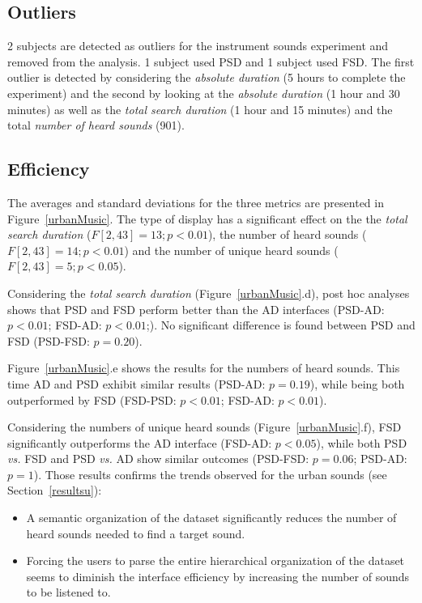 \documentclass{aes2e}
\begin{document}
\subsection{Outliers}

2 subjects are detected as outliers for the instrument sounds experiment and removed from the analysis. 1 subject used PSD and 1 subject used FSD. The first outlier is detected by considering the \textit{absolute duration} (5 hours to complete the experiment) and the second by looking at the \textit{absolute duration} (1 hour and 30 minutes) as well as the \textit{total search duration} (1 hour and 15 minutes) and the total \textit{number of heard sounds} (901).

\subsection{Efficiency}

The averages and standard deviations for the three metrics are presented in Figure~\ref{urbanMusic}. The type of display has a significant effect on the the \textit{total search duration} ($F[2,43]=13; p<0.01$), the number of heard sounds ($F[2,43]=14; p<0.01$) and the number of unique heard sounds ($F[2,43]=5; p<0.05$).

Considering the \textit{total search duration} (Figure~\ref{urbanMusic}.d), post hoc analyses shows that PSD and FSD perform better than the AD interfaces (PSD-AD: $p<0.01$; FSD-AD: $p<0.01$;). No significant difference is found between PSD and FSD (PSD-FSD: $p=0.20$).

Figure~\ref{urbanMusic}.e shows the results for the numbers of heard sounds. This time AD and PSD exhibit similar results (PSD-AD: $p=0.19$), while being both outperformed by FSD (FSD-PSD: $p<0.01$; FSD-AD: $p<0.01$).

Considering the numbers of unique heard sounds (Figure~\ref{urbanMusic}.f), FSD significantly outperforms the AD interface (FSD-AD: $p<0.05$), while both PSD \emph{vs.} FSD and PSD \emph{vs.} AD show similar outcomes (PSD-FSD: $p=0.06$; PSD-AD: $p=1$). Those results confirms the trends observed for the urban sounds (see Section~\ref{resultsu}):

\begin{itemize}
\item A semantic organization of the dataset significantly reduces  the number of heard sounds needed to find a target sound.
\item Forcing the users to parse the entire hierarchical organization of the dataset seems to diminish the interface efficiency by increasing the number of sounds to be listened to.
\end{itemize}
\end{document}
